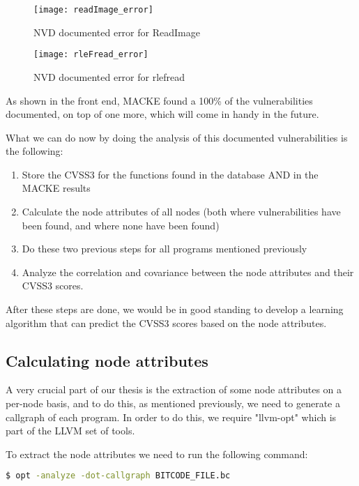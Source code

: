 \begin{figure}[!htb]
	\caption{NVD documented error for ReadImage}
	\centering
	\texttt{[image: readImage\_error]}
\end{figure}

\begin{figure}[!htb]
	\caption{NVD documented error for rlefread}
	\centering
	\texttt{[image: rleFread\_error]}
\end{figure}

As shown in the front end, MACKE found a 100\% of the vulnerabilities documented, on top of one more, which will come in handy in the future. 

What we can do now by doing the analysis of this documented vulnerabilities is the following:

\begin{enumerate}
	\item Store the CVSS3 for the functions found in the database AND in the MACKE results
	\item Calculate the node attributes of all nodes (both where vulnerabilities have been found, and where none have been found)
	\item Do these two previous steps for all programs mentioned previously
	\item Analyze the correlation and covariance between the node attributes and their CVSS3 scores.
\end{enumerate} 

After these steps are done, we would be in good standing to develop a learning algorithm that can predict the CVSS3 scores based on the node attributes.

\subsection{Calculating node attributes}

A very crucial part of our thesis is the extraction of some node attributes on a per-node basis, and to do this, as mentioned previously, we need to generate a callgraph of each program. In order to do this, we require "llvm-opt" which is part of the LLVM \parencite{llvm} set of tools.

To extract the node attributes we need to run the following command:

\begin{lstlisting}[language=bash]
$ opt -analyze -dot-callgraph BITCODE_FILE.bc
\end{lstlisting}

